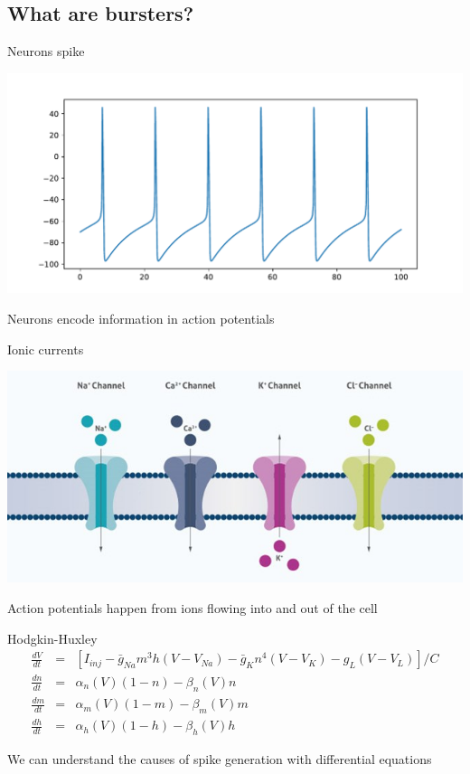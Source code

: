 \documentclass[presentation]{beamer}
\begin{document}
\subsection{What are bursters?}
\label{sec:org0e94b0b}
\begin{frame}[label={sec:org9d76c7d}]{Neurons spike}
\begin{center}
\includegraphics[width=.9\textwidth]{./HHraw.pdf}
\end{center}

Neurons encode information in action potentials
\end{frame}


\begin{frame}[label={sec:org32906a5}]{Ionic currents}
\begin{center}
\includegraphics[width=.9\textwidth]{./voltage-gated.jpg}
\end{center}

Action potentials happen from ions flowing into and out of the cell
\end{frame}


\begin{frame}[label={sec:org45bbdfd}]{Hodgkin-Huxley}
\begin{eqnarray}
\frac{dV}{dt} &=& \left[I_{inj} - \bar{g}_{Na}m^3h(V-V_{Na}) -\bar{g}_Kn^4(V-V_K) - g_L (V-V_L)\right]/C\nonumber\\
\frac{dn}{dt} &=& \alpha_n(V) (1-n) - \beta_n(V)n\nonumber\\
\frac{dm}{dt} &=& \alpha_m(V) (1-m) - \beta_m(V)m\nonumber\\
\frac{dh}{dt} &=& \alpha_h(V) (1-h) - \beta_h(V)h\nonumber  
\end{eqnarray}

\vfill

We can understand the causes of spike generation with differential equations
\end{frame}
\end{document}
